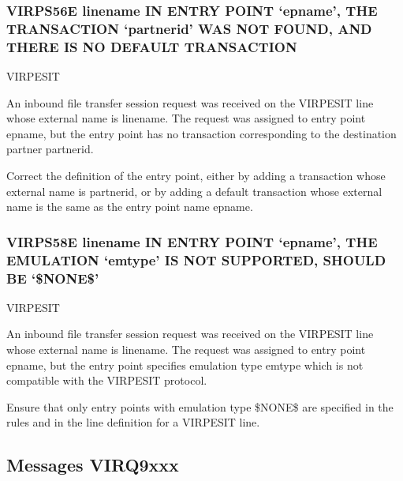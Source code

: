 \documentclass[letterpaper,10pt,english]{sphinxmanual}
\begin{document}
\subsubsection{VIRPS56E linename IN ENTRY POINT ‘epname’, THE TRANSACTION ‘partnerid’ WAS NOT FOUND, AND THERE IS NO DEFAULT TRANSACTION}
\label{\detokenize{messages:virps56e-linename-in-entry-point-epname-the-transaction-partnerid-was-not-found-and-there-is-no-default-transaction}}\begin{description}
\sphinxAtStartPar
VIRPESIT

\sphinxAtStartPar
An inbound file transfer session request was received on the VIRPESIT line whose external name is linename. The request was assigned to entry point epname, but the entry point has no transaction corresponding to the destination partner partnerid.

\sphinxAtStartPar
Correct the definition of the entry point, either by adding a transaction whose external name is partnerid, or by adding a default transaction whose external name is the same as the entry point name epname.

\end{description}


\subsubsection{VIRPS58E linename IN ENTRY POINT ‘epname’, THE EMULATION ‘emtype’ IS NOT SUPPORTED, SHOULD BE ‘\$NONE\$’}
\label{\detokenize{messages:virps58e-linename-in-entry-point-epname-the-emulation-emtype-is-not-supported-should-be-none}}\begin{description}
\sphinxAtStartPar
VIRPESIT

\sphinxAtStartPar
An inbound file transfer session request was received on the VIRPESIT line whose external name is linename. The request was assigned to entry point epname, but the entry point specifies emulation type emtype which is not compatible with the VIRPESIT protocol.

\sphinxAtStartPar
Ensure that only entry points with emulation type \$NONE\$ are specified in the rules and in the line definition for a VIRPESIT line.

\end{description}


\subsection{Messages VIRQ9xxx}
\label{\detokenize{messages:messages-virq9xxx}}
\end{document}
